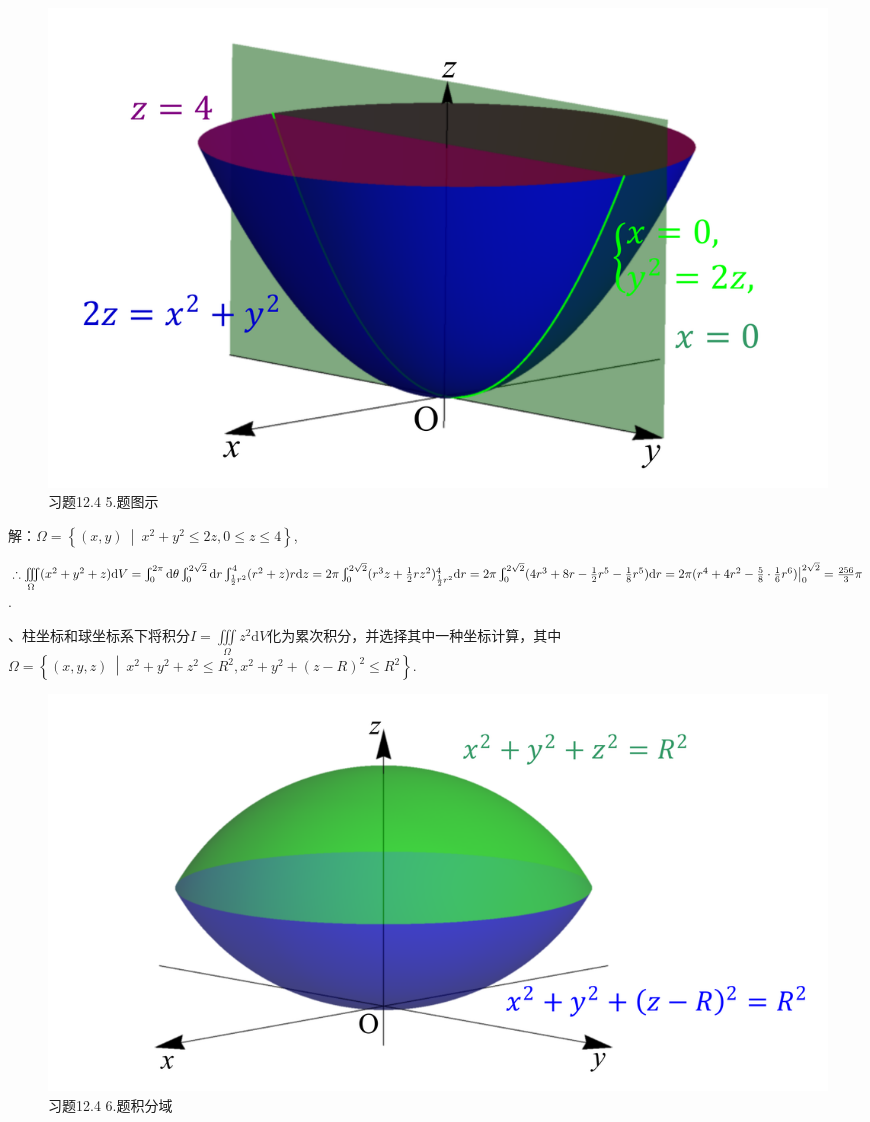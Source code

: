 \documentclass[12pt,UTF8]{ctexart}
\newcommand\Set[2]{\left\{#1\ \middle\vert\ #2 \right\}}
\newcommand{\Int}[4]{\varint\nolimits_{#1}^{#2}#3\mathrm d#4}
\newcommand{\IIInt}[3]{\iiint\limits_{#1}#2\mathrm d#3}
\begin{document}
\begin{enumerate}
\begin{figure}[H]
\begin{center}
\includegraphics[height=0.4\textheight]{Figures19/Fig12-4-5.pdf}
\end{center}
\caption{习题12.4 5.题图示}
\label{12-4-5}
\end{figure}

解：$\Omega=\Set{(x,y)}{x^2+y^2\leqslant2z,0\leqslant z\leqslant4}$,

$\therefore\IIInt\Omega{(x^2+y^2+z)}V=\Int0{2\pi}{}\theta\Int0{2\sqrt2}{}r\Int{\frac12r^2}4{(r^2+z)r}z=2\pi\Int0{2\sqrt2}{(r^3z+\frac12rz^2)_{\frac12r^2}^4}r\\
=2\pi\Int0{2\sqrt2}{(4r^3+8r-\frac12r^5-\frac18r^5)}r=2\pi(r^4+4r^2-\frac58\cdot\frac16r^6)\big|_0^{2\sqrt2}=\frac{256}3\pi$.

、柱坐标和球坐标系下将积分$I=\IIInt\Omega{z^2}V$化为累次积分，并选择其中一种坐标计算，其中$\Omega=\Set{(x,y,z)}{x^2+y^2+z^2\leqslant R^2,x^2+y^2+(z-R)^2\leqslant R^2}$.

\begin{figure}[H]
\begin{center}
\includegraphics[height=0.4\textheight]{Figures19/Fig12-4-6-1.pdf}
\end{center}
\caption{习题12.4 6.题积分域}
\label{12-4-6}
\end{figure}


\end{enumerate}
\end{document}
